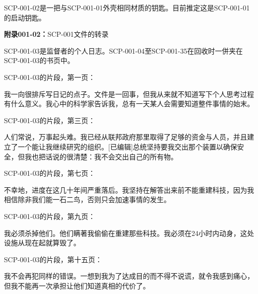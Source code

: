 \documentclass[openany,a4paper]{book} %
\begin{document}
SCP-001-02是一把与SCP-001-01外壳相同材质的钥匙。目前推定这是SCP-001-01的启动钥匙。\vspace{12pt}

\textbf{附录001-02：}SCP-001文件的转录\vspace{12pt}

SCP-001-03是监督者的个人日志。SCP-001-04至SCP-001-35在回收时一併夹在SCP-001-03的书页中。\vspace{12pt}

\clearpage

SCP-001-03的片段，第一页：
\begin{colorboxed}
我一向很排斥写日记的点子。文件是一回事，但我从来就不知道写下个人思考过程有什么意义。我心中的科学家告诉我，总有一天某人会需要知道整件事情的始末。
\end{colorboxed}

\vspace{8pt}

SCP-001-03的片段，第三页：
\begin{colorboxed}
人们常说，万事起头难。我已经从联邦政府那里取得了足够的资金与人员，并且建立了一个能让我继续研究的组织。[已编辑]总统坚持要我交出那个装置以确保安全，但我也把话说的很清楚：我不会交出自己的所有物。
\end{colorboxed}

\vspace{8pt}

SCP-001-03的片段，第七页：
\begin{colorboxed}
不幸地，进度在这几十年间严重落后。我坚持在解答出来前不能重建科技，因为我相信除非我们能一石二鸟，否则只会加速事情的发生。
\end{colorboxed}

\vspace{8pt}

SCP-001-03的片段，第九页：
\begin{colorboxed}
我必须杀掉他们。他们瞒著我偷偷在重建那些科技。我必须在24小时内动身，这处设施从现在起就算毁了。
\end{colorboxed}

\vspace{8pt}

SCP-001-03的片段，第十五页：
\begin{colorboxed}
我不会再犯同样的错误。一想到我为了达成目的而不得不说谎，就令我感到痛心，但我不能再一次承担让他们知道真相的代价了。
\end{colorboxed}

\vspace{8pt}
\end{document}
